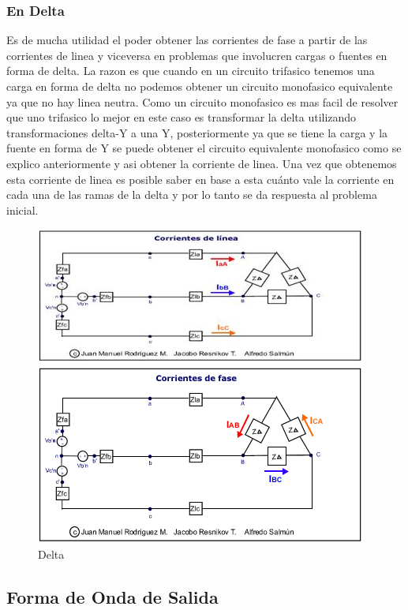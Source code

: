 \documentclass[11pt]{article}
\begin{document}
\subsubsection{En Delta}
Es de mucha utilidad el poder obtener las corrientes de fase a partir de las corrientes de linea y viceversa en problemas que involucren cargas o fuentes en forma de delta. La razon es que cuando en un circuito trifasico tenemos una carga en forma de delta no podemos obtener un circuito monofasico equivalente ya que no hay linea neutra. Como un circuito monofasico es mas facil de resolver que uno trifasico lo mejor en este caso es transformar la delta utilizando transformaciones delta-Y a una Y, posteriormente ya que se tiene la carga y la fuente en forma de Y se puede obtener el circuito equivalente monofasico como se explico anteriormente y asi obtener la corriente de linea. Una vez que obtenemos esta corriente de linea es posible saber en base a esta cuánto vale la corriente en cada una de las ramas de la delta y por lo tanto se da respuesta al problema inicial.
\begin{center}
\begin{figure}[htp]
\centering
\includegraphics[scale=0.70]{Conexion delta.png}
\caption{Delta}
\label{}
\end{figure}
\end{center}


\subsection{Forma de Onda de Salida}
\end{document}
